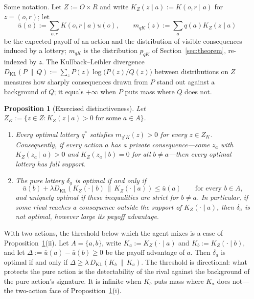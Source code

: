 \documentclass[11pt,a4paper]{article}
\newtheorem{proposition}[theorem]{Proposition}
\theoremstyle{definition}
\newcommand{\KL}{D_{\mathrm{KL}}}
\newcommand{\1}{\mathbf 1}
\begin{document}
Some notation.  Let $Z:=O\times R$ and write $K_Z(z\mid a):=K(o,r\mid a)$ for $z=(o,r)$; let
\[
 \bar u(a):=\sum_{o,r}K(o,r\mid a)u(o),
 \qquad
 m_{qK}(z):=\sum_aq(a)K_Z(z\mid a)
\]
be the expected payoff of an action and the distribution of visible consequences induced by a lottery; $m_{qK}$
is the distribution $p_{qK}$ of Section~\ref{sec:theorem}, re-indexed by $z$.  The
Kullback--Leibler divergence $\KL(P\,\|\,Q):=\sum_zP(z)\log\bigl(P(z)/Q(z)\bigr)$ between distributions on $Z$
measures how sharply consequences drawn from $P$ stand out against a background of $Q$; it equals $+\infty$ when
$P$ puts mass where $Q$ does not.

\begin{proposition}[Exercised distinctiveness]\label{cor:support-pure}
Let $Z_K:=\{z\in Z:K_Z(z\mid a)>0\text{ for some }a\in A\}$.
\begin{enumerate}[label=\textup{(\roman*)},leftmargin=*]
\item Every optimal lottery $q^*$ satisfies $m_{q^*K}(z)>0$ for every $z\in Z_K$.  Consequently, if every action $a$ has
a private consequence---some $z_a$ with $K_Z(z_a\mid a)>0$ and $K_Z(z_a\mid b)=0$ for all $b\ne a$---then every
optimal lottery has full support.
\item The pure lottery $\delta_a$ is optimal if and only if
\[
 \bar u(b)+\lambda
 \KL\!\left(K_Z(\cdot\mid b)\,\middle\|\,K_Z(\cdot\mid a)\right)
 \le \bar u(a)
 \qquad\text{for every }b\in A,
\]
and uniquely optimal if these inequalities are strict for $b\ne a$.  In particular, if some rival reaches a
consequence outside the support of $K_Z(\cdot\mid a)$, then $\delta_a$ is not optimal, however large its payoff
advantage.
\end{enumerate}
\end{proposition}

With two actions, the threshold below which the agent mixes is a case of
Proposition~\ref{cor:support-pure}\textup{(ii)}.  Let $A=\{a,b\}$, write $K_a:=K_Z(\cdot\mid a)$ and
$K_b:=K_Z(\cdot\mid b)$, and let $\Delta:=\bar u(a)-\bar u(b)\ge0$ be the payoff advantage of $a$.  Then
$\delta_a$ is optimal if and only if $\Delta\ge\lambda\,\KL(K_b\,\|\,K_a)$.  The threshold is directional: what
protects the pure action is the detectability of the rival against the background of the pure action's signature.  It is
infinite when $K_b$ puts mass where $K_a$ does not---the two-action face of
Proposition~\ref{cor:support-pure}\textup{(i)}.
\end{document}
